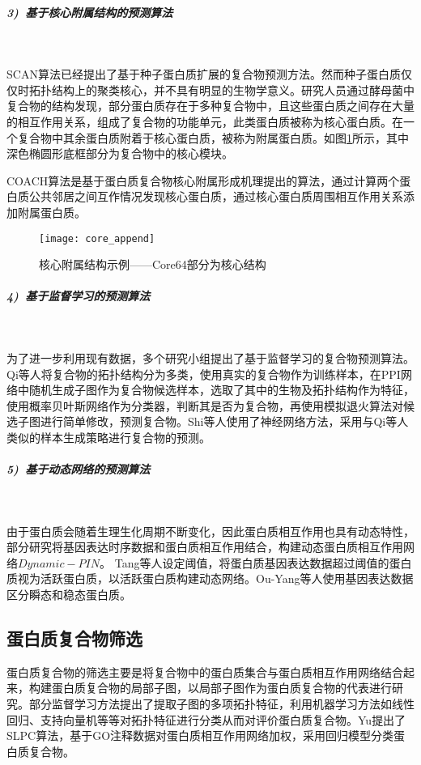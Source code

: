 \subparagraph*{3)~基于核心附属结构的预测算法} ~

SCAN算法\cite{mete_structural_2008}已经提出了基于种子蛋白质扩展的复合物预测方法。然而种子蛋白质仅仅时拓扑结构上的聚类核心，并不具有明显的生物学意义。研究人员\cite{gavin_proteome_2006}通过酵母菌中复合物的结构发现，部分蛋白质存在于多种复合物中，且这些蛋白质之间存在大量的相互作用关系，组成了复合物的功能单元，此类蛋白质被称为核心蛋白质。在一个复合物中其余蛋白质附着于核心蛋白质，被称为附属蛋白质。如图\ref{fig:core_append}所示，其中深色椭圆形底框部分为复合物中的核心模块。

COACH算法\cite{leung_predicting_2009}是基于蛋白质复合物核心附属形成机理提出的算法，通过计算两个蛋白质公共邻居之间互作情况发现核心蛋白质，通过核心蛋白质周围相互作用关系添加附属蛋白质。

\begin{figure}[htbp]
  \centering
  \texttt{[image: core\_append]}
  \caption{核心附属结构示例——Core64部分为核心结构\cite{leung_predicting_2009}}
  \label{fig:core_append}
\end{figure}

\subparagraph*{4)~基于监督学习的预测算法} ~

为了进一步利用现有数据，多个研究小组提出了基于监督学习的复合物预测算法。Qi等人\cite{qi_protein_2008}将复合物的拓扑结构分为多类，使用真实的复合物作为训练样本，在PPI网络中随机生成子图作为复合物候选样本，选取了其中的生物及拓扑结构作为特征，使用概率贝叶斯网络作为分类器，判断其是否为复合物，再使用模拟退火算法对候选子图进行简单修改，预测复合物。Shi等人\cite{shi_protein_2011}使用了神经网络方法，采用与Qi等人类似的样本生成策略进行复合物的预测。

\subparagraph*{5)~基于动态网络的预测算法} ~

由于蛋白质会随着生理生化周期不断变化，因此蛋白质相互作用也具有动态特性，部分研究\cite{li_dynamic_2017}将基因表达时序数据和蛋白质相互作用结合，构建动态蛋白质相互作用网络$Dynamic-PIN$。
Tang等人\cite{tang_comparison_2011}设定阈值，将蛋白质基因表达数据超过阈值的蛋白质视为活跃蛋白质，以活跃蛋白质构建动态网络。Ou-Yang等人\cite{ou-yang_detecting_2014}使用基因表达数据区分瞬态和稳态蛋白质。

\subsection{蛋白质复合物筛选}
\label{subsection:research:Selection}

蛋白质复合物的筛选主要是将复合物中的蛋白质集合与蛋白质相互作用网络结合起来，构建蛋白质复合物的局部子图，以局部子图作为蛋白质复合物的代表进行研究。部分监督学习方法\cite{dong_predicting_2018}提出了提取子图的多项拓扑特征，利用机器学习方法如线性回归、支持向量机等等对拓扑特征进行分类从而对评价蛋白质复合物。Yu\cite{yu_protein_2015}提出了SLPC算法，基于GO注释数据对蛋白质相互作用网络加权，采用回归模型分类蛋白质复合物。

